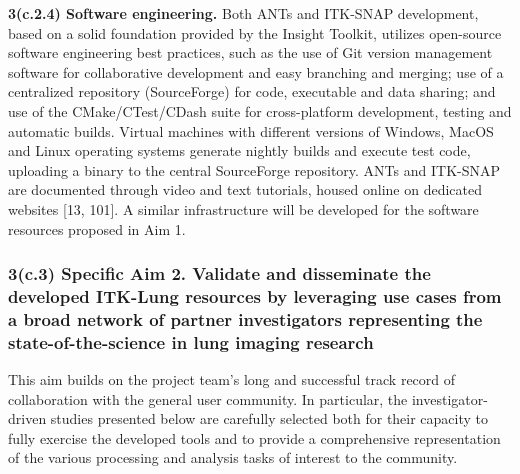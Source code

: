 \documentclass[11pt,]{article}
\begin{document}
\textbf{3(c.2.4) Software engineering.} Both ANTs and ITK-SNAP
development, based on a solid foundation provided by the Insight
Toolkit, utilizes open-source software engineering best practices, such
as the use of Git version management software for collaborative
development and easy branching and merging; use of a centralized
repository (SourceForge) for code, executable and data sharing; and use
of the CMake/CTest/CDash suite for cross-platform development, testing
and automatic builds. Virtual machines with different versions of
Windows, MacOS and Linux operating systems generate nightly builds and
execute test code, uploading a binary to the central SourceForge
repository. ANTs and ITK-SNAP are documented through video and text
tutorials, housed online on dedicated websites {[}13, 101{]}. A similar
infrastructure will be developed for the software resources proposed in
Aim 1.

\subsubsection{3(c.3) \textbf{Specific Aim 2.} Validate and disseminate
the developed ITK-Lung resources by leveraging use cases from a broad
network of partner investigators representing the state-of-the-science
in lung imaging
research}\label{c.3-specific-aim-2.-validate-and-disseminate-the-developed-itk-lung-resources-by-leveraging-use-cases-from-a-broad-network-of-partner-investigators-representing-the-state-of-the-science-in-lung-imaging-research}

This aim builds on the project team's long and successful track record
of collaboration with the general user community. In particular, the
investigator-driven studies presented below are carefully selected both
for their capacity to fully exercise the developed tools and to provide
a comprehensive representation of the various processing and analysis
tasks of interest to the community.
\end{document}

